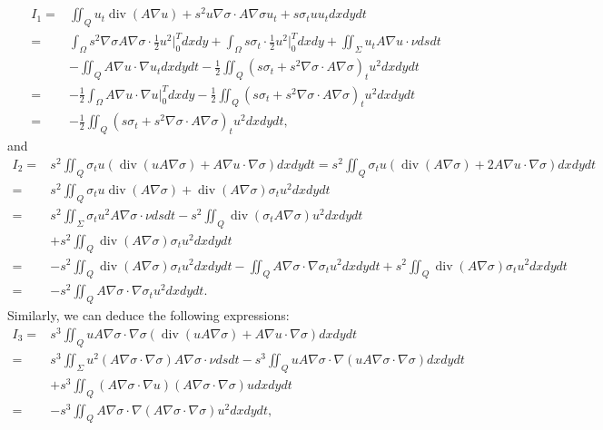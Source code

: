 \documentclass[9pt,reqno]{amsart}
\theoremstyle{plain}
\numberwithin{equation}{section}
\numberwithin{theorem}{section}
\def\Om{\Omega}
\DeclareMathOperator*{\Div}{\mathrm{div}}
\def\Om{\Omega}
\begin{document}
	\begin{equation}\label{I1}
		\begin{split}
			I_1=&\iint_Q u_t \Div (A\nabla u) +s^2 u \nabla \sigma \cdot A\nabla \sigma u_t + s\sigma_t u u_t dx dy dt\\
			=&\int_{\Om} s^2  \nabla \sigma A\nabla \sigma\cdot \frac{1}{2}u^2  \bigg|_0^T dx dy  + \int_{\Om} s\sigma_t\cdot \frac{1}{2}u^2 \bigg|_0^T dx dy + \iint_\Sigma u_t A\nabla u \cdot \nu ds dt\\
			&-\iint_{Q} A\nabla u \cdot \nabla u_t dx dy dt -\frac{1}{2}\iint_{Q}(s\sigma_t + s^2 \nabla \sigma \cdot A\nabla \sigma)_t u^2 dx dy dt\\
			=& - \frac{1}{2}\int_{\Om}  A\nabla u \cdot \nabla u \bigg|_0^T dx dy  -\frac{1}{2}\iint_{Q}(s\sigma_t + s^2 \nabla \sigma \cdot A\nabla \sigma)_t u^2 dx dy dt\\
			=& -\frac{1}{2}\iint_{Q}(s\sigma_t + s^2 \nabla \sigma \cdot A\nabla \sigma)_t u^2 dx dy dt,
		\end{split}
	\end{equation}
	and
	\begin{equation}\label{I2}
		\begin{split}
			I_2  =& s^2  \iint_Q \sigma_t u (\Div(u A \nabla \sigma) + A\nabla u \cdot \nabla \sigma) dx dy dt
			= s^2  \iint_Q \sigma_t u (\Div( A \nabla \sigma) + 2 A\nabla u \cdot \nabla \sigma) dx dy dt\\
			=& s^2  \iint_Q \sigma_t u \Div( A \nabla \sigma) + \Div( A \nabla \sigma) \sigma_t u^2  dx dy dt\\
			=& s^2 \iint_\Sigma \sigma_t u^2 A \nabla \sigma  \cdot \nu dsdt - s^2  \iint_Q \Div(\sigma_t A \nabla \sigma)u^2 dx dydt\\
			&+ s^2  \iint_Q \Div( A \nabla \sigma) \sigma_t u^2 dx dy dt\\
			=& - s^2  \iint_Q \Div( A \nabla \sigma) \sigma_t u^2 dx dy dt -\iint_Q  A \nabla \sigma \cdot\nabla \sigma_t u^2    dx dy dt+ s^2\iint_Q \Div( A \nabla \sigma) \sigma_t u^2 dx dydt\\
			=& -s^2\iint_Q  A \nabla \sigma \cdot\nabla \sigma_t u^2    dx dy dt.
		\end{split}
	\end{equation}
	Similarly, we can deduce the following expressions:
	\begin{equation}\label{I3}
		\begin{split}
			I_3  =&s^3 \iint_Q u A \nabla \sigma \cdot \nabla \sigma (\Div (u A \nabla \sigma) + A\nabla u \cdot \nabla \sigma ) dx dy dt\\
			=&s^3 \iint_\Sigma u^2 (A \nabla \sigma \cdot \nabla \sigma) A \nabla \sigma \cdot \nu  ds dt -s^3 \iint_Q u A \nabla \sigma \cdot \nabla (u A \nabla \sigma \cdot \nabla \sigma  ) dx dy dt\\
			&+ s^3 \iint_Q  (A \nabla \sigma \cdot \nabla u) ( A \nabla \sigma \cdot \nabla \sigma  ) u dx dy dt\\
			=&-s^3\iint_Q  A\nabla \sigma \cdot \nabla ( A\nabla \sigma \cdot\nabla \sigma) u^2 dx dy dt,
		\end{split}
	\end{equation}
\end{document}
